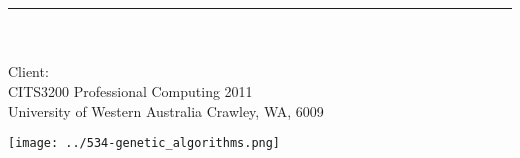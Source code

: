 
{}


\begin{titlepage}

\begin{center}

\vspace{1cm}

\textsc{\LARGE \getprojectname}\\[0.5cm]
\textsc{\huge \gettitle}\\[0.5cm]
\rule{0.9\textwidth}{0.7pt} \\[0.75cm]
\emph{\getauthor} \\[0.5cm]
Client: \emph{\getclient} \\[0.5cm]

CITS3200 Professional Computing 2011 \\
University of Western Australia Crawley, WA, 6009

\vspace{2cm}
\texttt{[image: ../534-genetic\_algorithms.png]}

\end{center}

\end{titlepage}
